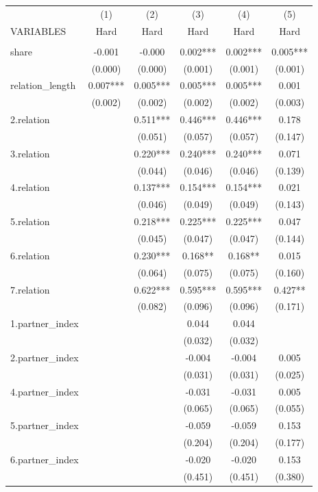
\begin{tabular}{lccccc} \hline
 & (1) & (2) & (3) & (4) & (5) \\
VARIABLES & Hard & Hard & Hard & Hard & Hard \\ \hline
 &  &  &  &  &  \\
share & -0.001 & -0.000 & 0.002*** & 0.002*** & 0.005*** \\
 & (0.000) & (0.000) & (0.001) & (0.001) & (0.001) \\
relation\_length & 0.007*** & 0.005*** & 0.005*** & 0.005*** & 0.001 \\
 & (0.002) & (0.002) & (0.002) & (0.002) & (0.003) \\
2.relation &  & 0.511*** & 0.446*** & 0.446*** & 0.178 \\
 &  & (0.051) & (0.057) & (0.057) & (0.147) \\
3.relation &  & 0.220*** & 0.240*** & 0.240*** & 0.071 \\
 &  & (0.044) & (0.046) & (0.046) & (0.139) \\
4.relation &  & 0.137*** & 0.154*** & 0.154*** & 0.021 \\
 &  & (0.046) & (0.049) & (0.049) & (0.143) \\
5.relation &  & 0.218*** & 0.225*** & 0.225*** & 0.047 \\
 &  & (0.045) & (0.047) & (0.047) & (0.144) \\
6.relation &  & 0.230*** & 0.168** & 0.168** & 0.015 \\
 &  & (0.064) & (0.075) & (0.075) & (0.160) \\
7.relation &  & 0.622*** & 0.595*** & 0.595*** & 0.427** \\
 &  & (0.082) & (0.096) & (0.096) & (0.171) \\
1.partner\_index &  &  & 0.044 & 0.044 &  \\
 &  &  & (0.032) & (0.032) &  \\
2.partner\_index &  &  & -0.004 & -0.004 & 0.005 \\
 &  &  & (0.031) & (0.031) & (0.025) \\
4.partner\_index &  &  & -0.031 & -0.031 & 0.005 \\
 &  &  & (0.065) & (0.065) & (0.055) \\
5.partner\_index &  &  & -0.059 & -0.059 & 0.153 \\
 &  &  & (0.204) & (0.204) & (0.177) \\
6.partner\_index &  &  & -0.020 & -0.020 & 0.153 \\
 &  &  & (0.451) & (0.451) & (0.380) \\

\end{tabular}
